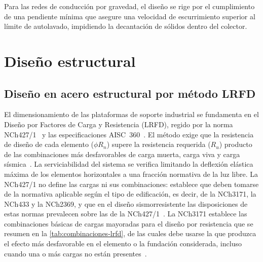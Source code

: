 Para las redes de conducción por gravedad, el diseño se rige por el cumplimiento de una pendiente mínima que asegure una velocidad de escurrimiento superior al límite de autolavado, impidiendo la decantación de sólidos dentro del colector.

\section{Diseño estructural}
\label{sec:mt-estructural}

\subsection{Diseño en acero estructural por método LRFD}

El dimensionamiento de las plataformas de soporte industrial se fundamenta en el Diseño por Factores de Carga y Resistencia (LRFD), regido por la norma NCh427/1~\parencite{inn2016nch427} y las especificaciones AISC~360~\parencite{aisc2016specification}.
El método exige que la resistencia de diseño de cada elemento ($\phi R_n$) supere la resistencia requerida ($R_u$) producto de las combinaciones más desfavorables de carga muerta, carga viva y carga sísmica~\parencite{mccormac2012structural,segui2017steel}.
La serviciabilidad del sistema se verifica limitando la deflexión elástica máxima de los elementos horizontales a una fracción normativa de la luz libre.
La NCh427/1 no define las cargas ni sus combinaciones: establece que deben tomarse de la normativa aplicable según el tipo de edificación, es decir, de la NCh3171, la NCh433 y la NCh2369, y que en el diseño sismorresistente las disposiciones de estas normas prevalecen sobre las de la NCh427/1~\parencite{inn2016nch427}.
La NCh3171 establece las combinaciones básicas de cargas mayoradas para el diseño por resistencia que se resumen en la \cref{tab:combinaciones-lrfd}, de las cuales debe usarse la que produzca el efecto más desfavorable en el elemento o la fundación considerada, incluso cuando una o más cargas no están presentes~\parencite{inn2017nch3171}.

